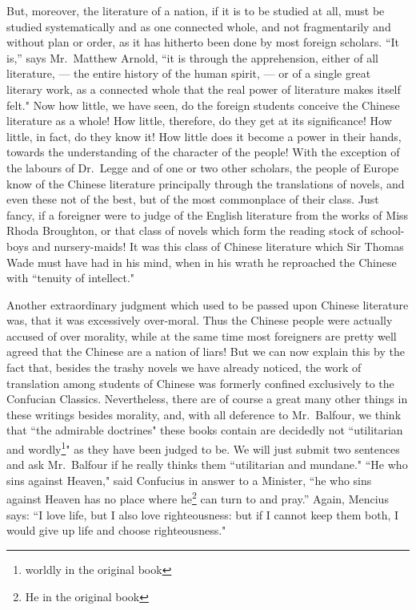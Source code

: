But, moreover, the literature of a nation, if it is to be studied at all, must be studied systematically and as one connected whole, and not fragmentarily and without plan or order, as it has hitherto been done by most foreign scholars.
``It is,'' says Mr.~Matthew Arnold,  ``it is through the apprehension, either of all literature, --- the entire history of the human spirit, --- or of a single great literary work, as a connected whole that the real power of literature makes itself felt."
Now how little, we have seen, do the foreign students conceive the Chinese literature as a whole!
How little, therefore, do they get at its significance!
How little, in fact, do they know it!
How little does it become a power in their hands, towards the understanding of the character of the people!
With the exception of the labours of Dr.~Legge and of one or two other scholars, the people of Europe know of the Chinese literature principally through the translations of novels, and even these not of the best, but of the most commonplace of their class.
Just fancy, if a foreigner were to judge of the English literature from the works of Miss Rhoda Broughton,  or that class of novels which form the reading stock of school-boys and nursery-maids!
It was this class of Chinese literature which Sir Thomas Wade must have had in his mind, when in his wrath he reproached the Chinese with ``tenuity of intellect."

Another extraordinary judgment which used to be passed upon Chinese literature was, that it was excessively over-moral. 
Thus the Chinese people were actually accused of over morality, while at the same time most foreigners are pretty well agreed that the Chinese are a nation of liars!
But we can now explain this by the fact that, besides the trashy novels we have already noticed, the work of translation among students of Chinese was formerly confined exclusively to the Confucian Classics.
Nevertheless, there are of course a great many other things in these writings besides morality, and, with all deference to Mr.~Balfour, we think that ``the admirable doctrines" these books contain are decidedly not ``utilitarian and wordly\footnote{worldly in the original book}"  as they have been judged to be.
We will just submit two sentences and ask Mr.~Balfour if he really thinks them ``utilitarian and mundane."
``He who sins against Heaven," said Confucius in answer to a Minister, ``he who sins against Heaven has no place where he\footnote{He in the original book} can turn to and pray.''
Again, Mencius says: ``I love life, but I also love righteousness: but if I cannot keep them both, I would give up life and choose righteousness."

